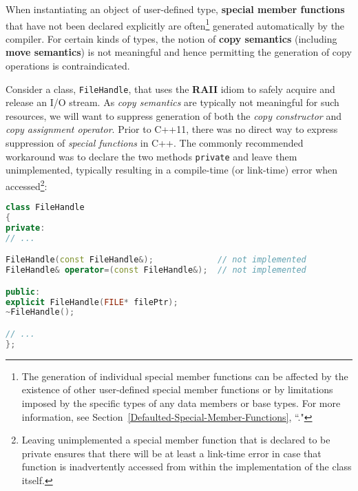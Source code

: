 When instantiating an object of user-defined type, \textbf{special
member functions} that have not been declared explicitly are
often{\cprotect\footnote{The generation of individual special member
functions can be affected by the existence of other user-defined special
member functions or by limitations imposed by the specific types of
any data members or base types. For more information, see Section~\ref{Defaulted-Special-Member-Functions}, ``."}} generated automatically by the compiler.
For certain kinds of types, the notion of \textbf{copy semantics}
(including \textbf{move semantics}) is not meaningful and
hence permitting the generation of copy operations is contraindicated.

Consider a class, \texttt{FileHandle}, that uses the \textbf{RAII} idiom
to safely acquire and release an I/O stream. As \emph{copy semantics}
are typically not meaningful for such resources, we will want to
suppress generation of both the \emph{copy constructor} and \emph{copy
assignment operator}. Prior to C++11, there was no direct way to express
suppression of \emph{special functions} in C++. The commonly
recommended workaround was to declare the two methods \texttt{private}
and leave them unimplemented, typically resulting in a compile-time (or
link-time) error when accessed{\cprotect\footnote{Leaving unimplemented a special
member function that is declared to be private ensures
that there will be at least a link-time error in case that function is
inadvertently accessed from within the implementation of the class
itself.}}:

\begin{lstlisting}[language=C++]
class FileHandle
{
private:
// ...

FileHandle(const FileHandle&);             // not implemented
FileHandle& operator=(const FileHandle&);  // not implemented

public:
explicit FileHandle(FILE* filePtr);
~FileHandle();

// ...
};
\end{lstlisting}

